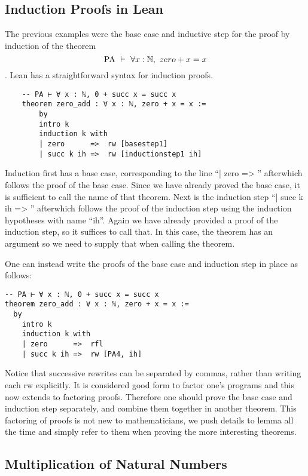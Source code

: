 \documentclass{book}
\begin{document}
\newpage
\subsection*{Induction Proofs in Lean}

The previous examples were the base case and inductive step for the proof by induction of the theorem $$\PA \ \vdash \ \forall x : \bn, \ zero + x = x$$. Lean has a straightforward syntax for induction proofs. 
\begin{center}
    \begin{lstlisting}
    -- PA ⊢ ∀ x : ℕ, 0 + succ x = succ x
    theorem zero_add : ∀ x : ℕ, zero + x = x :=
        by
        intro k
        induction k with
        | zero      =>  rw [basestep1]
        | succ k ih =>  rw [inductionstep1 ih]
    \end{lstlisting}
\end{center}
Induction first has a base case, corresponding to the line ``| zero => '' afterwhich follows the proof of the base case. Since we have already proved the base case, it is sufficient to call the name of that theorem. Next is the induction step ``| succ k ih => '' afterwhich follows the proof of the induction step using the induction hypotheses with name ``ih''. Again we have already provided a proof of the induction step, so it suffices to call that. In this case, the theorem has an argument so we need to supply that when calling the theorem.

One can instead write the proofs of the base case and induction step in place as follows: 
\begin{lstlisting}
-- PA ⊢ ∀ x : ℕ, 0 + succ x = succ x
theorem zero_add : ∀ x : ℕ, zero + x = x :=
  by
    intro k
    induction k with
    | zero      =>  rfl
    | succ k ih =>  rw [PA4, ih]
\end{lstlisting}
Notice that successive rewrites can be separated by commas, rather than writing each rw explicitly. It is considered good form to factor one's programs and this now extends to factoring proofs. Therefore one should prove the base case and induction step separately, and combine them together in another theorem. This factoring of proofs is not new to mathematicians, we push details to lemma all the time and simply refer to them when proving the more interesting theorems. 

\newpage
\subsection*{Multiplication of Natural Numbers}
\end{document}

